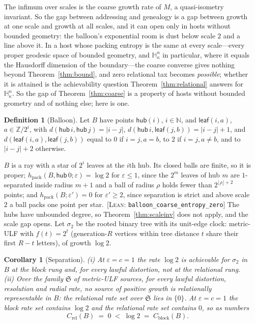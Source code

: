 \documentclass[11pt,reqno]{amsart}
\theoremstyle{plain}
\newtheorem{corollary}[theorem]{Corollary}
\theoremstyle{definition}
\newtheorem{definition}[theorem]{Definition}
\newcommand{\hpack}{h_{\mathrm{pack}}}
\newcommand{\Crel}{C_{\mathrm{rel}}}
\newcommand{\Cblock}{C_{\mathrm{block}}}
\newcommand{\Hk}{\mathbb{H}^n_\kappa}
\newcommand{\eps}{\varepsilon}
\newcommand{\cert}[1]{{\footnotesize\ [\textsc{Lean}: \texttt{#1}]}}
\begin{document}
The infimum over scales is the coarse growth rate of $M$, a quasi-isometry invariant. So the gap between addressing and genealogy is a gap between growth at one scale and growth at all scales, and it can open only in hosts without bounded geometry: the balloon's exponential room is dust below scale $2$ and a line above it. In a host whose packing entropy is the same at every scale---every proper geodesic space of bounded geometry, and $\Hk$ in particular, where it equals the Hausdorff dimension of the boundary---the coarse converse gives nothing beyond Theorem~\ref{thm:bound}, and zero relational tax becomes \emph{possible}; whether it is attained is the achievability question Theorem~\ref{thm:relational} answers for $\Hk$. So the gap of Theorem~\ref{thm:coarse} is a property of hosts without bounded geometry and of nothing else; here is one.

\begin{definition}[Balloon]
Let $B$ have points $\mathsf{hub}(i)$, $i\in\mathbb N$, and $\mathsf{leaf}(i,a)$, $a\in\mathbb Z/2^i$, with $d(\mathsf{hub}\,i,\mathsf{hub}\,j)=|i-j|$, $d(\mathsf{hub}\,i,\mathsf{leaf}(j,b))=|i-j|+1$, and $d(\mathsf{leaf}(i,a),\mathsf{leaf}(j,b))$ equal to $0$ if $i=j,a=b$, to $2$ if $i=j,a\ne b$, and to $|i-j|+2$ otherwise.
\end{definition}


$B$ is a ray with a star of $2^i$ leaves at the $i$th hub. Its closed balls are finite, so it is proper; $\hpack(B,\mathsf{hub}\,0;\eps)=\log2$ for $\eps\le1$, since the $2^m$ leaves of hub $m$ are $1$-separated inside radius $m+1$ and a ball of radius $\rho$ holds fewer than $2^{\lfloor\rho\rfloor+2}$ points; and $\hpack(B;\eps')=0$ for $\eps'\ge2$, since separation is strict and above scale $2$ a ball packs one point per star.\cert{balloon\_\allowbreak{}coarse\_\allowbreak{}entropy\_\allowbreak{}zero} The hubs have unbounded degree, so Theorem~\ref{thm:scaleinv} does not apply, and the scale gap opens. Let $\sigma_2$ be the rooted binary tree with its unit-edge clock: metric-ULF with $f(t)=2^t$ (generation-$R$ vertices within tree distance $t$ share their first $R-t$ letters), of growth $\log2$.

\begin{corollary}[Separation]\label{thm:sep}\label{thm:sepcap}
\emph{(i)} At $\eps=c=1$ the rate $\log2$ is achievable for $\sigma_2$ in $B$ at the block rung and, for every lawful distortion, not at the relational rung. \emph{(ii)} Over the family $\mathfrak S$ of metric-ULF sources, for every lawful distortion, resolution and radial rate, no source of positive growth is relationally representable in $B$: the relational rate set over $\mathfrak S$ lies in $\{0\}$. At $\eps=c=1$ the block rate set contains $\log2$ and the relational rate set contains $0$, so as numbers
\[
\Crel(B)\;=\;0\;<\;\log2\;=\;\Cblock(B).
\]
\end{corollary}
\end{document}

